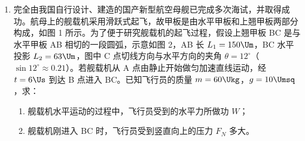 \documentclass[\gkver]{gaokaozhenti}
\begin{document}
\begin{enumerate}
{（2）①玻璃砖越厚，入射光线与出射光线侧移距离越大，作图时相对误差越小；两枚大头针间的距离越大，在确定入射及出射光线时的相对误差越小；大头针应选用较细的，减少测量误差；玻璃砖两光学面平行与否不影响测量结果。故 AD 正确。

②出射光线应向左侧移且平行于入射光线，故 D 正确。

③设入射角为 $\theta_1$，折射角为 $\theta_2$，则折射率 $n=\frac{\sin\theta_1}{\sin\theta_2}=\frac{\frac{AC}{AO}}{\frac{BD}{BO}}=\frac{AC}{BD}$。

（3）①由题图可知，螺旋测微器的读数为 $0\Umm + 20.0 \times 0.01\Umm = 0.200\Umm$。

②实验电路图如答图所示。


③电流表 A$_{1}$ 与金属丝 $R_{x}$ 并联，则 $R_{x}$ 两端电压为 $I_{1}R_{1}$，通过 $R_{x}$ 的电流为 $I_{2}-I_{1}$，则金属丝的阻值 $R_{x}=\frac{I_{1}R_{1}}{I_{2}-I_{1}}$。根据分析可知，理论上测量值与真实值相等。
}

\item
完全由我国自行设计、建造的国产新型航空母舰已完成多次海试，并取得成功。航母上的舰载机采用滑跃式起飞，故甲板是由水平甲板和上翘甲板两部分构成，如图 1 所示。为了便于研究舰载机的起飞过程，假设上翘甲板 BC 是与水平甲板 AB 相切的一段圆弧，示意如图 2，AB 长 $L_{1}=150\Um$，BC 水平投影 $L_{2} = 63\Um$，图中 C 点切线方向与水平方向的夹角 $\theta = 12^\circ$（$\sin 12^\circ \approx 0.21$）。若舰载机从 A 点由静止开始做匀加速直线运动，经 $t = 6\Us$ 到达 B 点进入 BC。已知飞行员的质量 $m = 60\Ukg$，$g = 10\Umsq$，求：
\begin{enumerate}
	\item
	舰载机水平运动的过程中，飞行员受到的水平力所做功 $W$；
	\item
	舰载机刚进入 BC 时，飞行员受到竖直向上的压力 $F_{N}$ 多大。
\end{enumerate}
\onepicture[align=right, h=4.20cm]{}
\end{enumerate}
\end{document}
